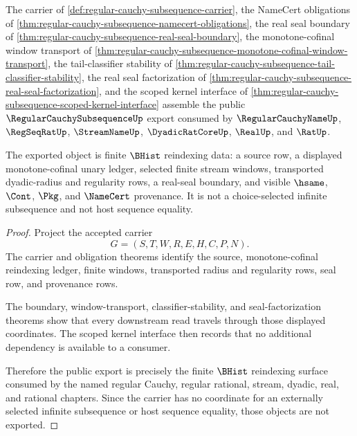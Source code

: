 \begin{theorem}
\label{thm:regular-cauchy-subsequence-public-export}
The carrier of \autoref{def:regular-cauchy-subsequence-carrier}, the NameCert obligations of \autoref{thm:regular-cauchy-subsequence-namecert-obligations}, the real seal boundary of \autoref{thm:regular-cauchy-subsequence-real-seal-boundary}, the monotone-cofinal window transport of \autoref{thm:regular-cauchy-subsequence-monotone-cofinal-window-transport}, the tail-classifier stability of \autoref{thm:regular-cauchy-subsequence-tail-classifier-stability}, the real seal factorization of \autoref{thm:regular-cauchy-subsequence-real-seal-factorization}, and the scoped kernel interface of \autoref{thm:regular-cauchy-subsequence-scoped-kernel-interface} assemble the public $\RegularCauchySubsequenceUp$ export consumed by $\RegularCauchyNameUp$, $\RegSeqRatUp$, $\StreamNameUp$, $\DyadicRatCoreUp$, $\RealUp$, and $\RatUp$.

The exported object is finite $\BHist$ reindexing data: a source row, a displayed monotone-cofinal unary ledger, selected finite stream windows, transported dyadic-radius and regularity rows, a real-seal boundary, and visible $\hsame$, $\Cont$, $\Pkg$, and $\NameCert$ provenance. It is not a choice-selected infinite subsequence and not host sequence equality.
\end{theorem}
\begin{proof}
Project the accepted carrier
$$
G=(S,T,W,R,E,H,C,P,N).
$$
The carrier and obligation theorems identify the source, monotone-cofinal reindexing ledger, finite windows, transported radius and regularity rows, seal row, and provenance rows.

The boundary, window-transport, classifier-stability, and seal-factorization theorems show that every downstream read travels through those displayed coordinates. The scoped kernel interface then records that no additional dependency is available to a consumer.

Therefore the public export is precisely the finite $\BHist$ reindexing surface consumed by the named regular Cauchy, regular rational, stream, dyadic, real, and rational chapters. Since the carrier has no coordinate for an externally selected infinite subsequence or host sequence equality, those objects are not exported.
\end{proof}

